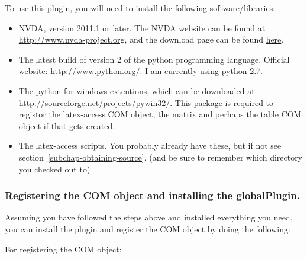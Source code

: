 \documentclass[12pt,a4paper]{report}
\begin{document}
To use this plugin, you will need to install the following software/libraries:

\begin{itemize}
\item NVDA, version 2011.1 or later.  The NVDA website can be found at
  \url{http://www.nvda-project.org}, and the download page can be found 
  \href{http://www.nvda-project.org/download/}{here}.
\item The latest build of version
  2 of the python programming language.  Official website:
  \url{http://www.python.org/}.  I am currently using python 2.7.
\item The python for windows extentions, which
  can be downloaded at \url{http://sourceforge.net/projects/pywin32/}.  This
  package is required to registor the latex-access COM object, the
  matrix and perhaps the table COM object if that gets created.
\item The latex-access scripts.  You probably already have these,
  but if not see section~\ref{subchap-obtaining-source}. (and be sure to remember
  which directory you checked out to)
\end{itemize}

\subsubsection{Registering the COM object and installing the globalPlugin.}

Assuming you have followed the steps above and installed everything you need, you can install the plugin and register the COM object by doing the following:

For registering the COM object:
\end{document}
